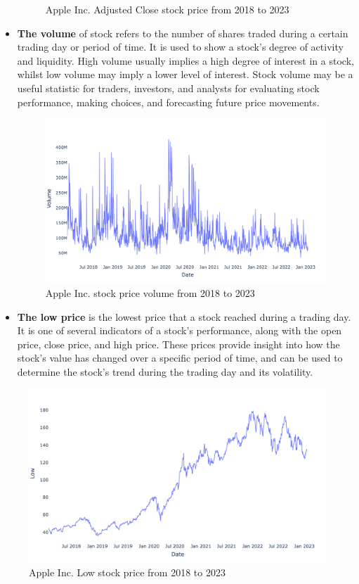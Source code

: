 \documentclass[a4paper]{article}
\begin{document}
\begin{itemize}[leftmargin=7.5pt]
\begin{figure}[!h]
    \caption{Apple Inc. Adjusted Close stock price from 2018 to 2023}
    \label{fig:adj}
\end{figure}
    \item \textbf{The volume} of stock refers to the number of shares traded during a certain trading day or period of time. It is used to show a stock's degree of activity and liquidity. High volume usually implies a high degree of interest in a stock, whilst low volume may imply a lower level of interest. Stock volume may be a useful statistic for traders, investors, and analysts for evaluating stock performance, making choices, and forecasting future price movements.
    \begin{figure}[!h]
    \centering
    \includegraphics[width=15cm]{vol.png}
    \caption{Apple Inc. stock price volume from 2018 to 2023}
    \label{fig:vol}
\end{figure}
\item \textbf{The low price} is the lowest price that a stock reached during a trading day. It is one of several indicators of a stock's performance, along with the open price, close price, and high price. These prices provide insight into how the stock's value has changed over a specific period of time, and can be used to determine the stock's trend during the trading day and its volatility.
\end{itemize}

\begin{figure}[!h]
    \centering
    \includegraphics[width=15cm]{low.png}
    \caption{Apple Inc. Low stock price from 2018 to 2023}
    \label{fig:low}
\end{figure}
\end{document}
